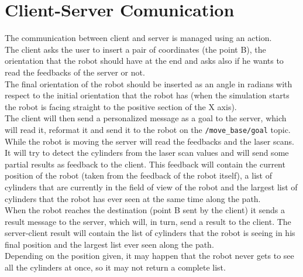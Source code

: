\section{Client-Server Comunication}
The communication between client and server is managed using an action.\\
The client asks the user to insert a pair of coordinates (the point B), the orientation that the robot should have at the end and asks also if he wants to read the feedbacks of the server or not.\\
The final orientation of the robot should be inserted as an angle in radians with respect to the initial orientation that the robot has (when the simulation starts the robot is facing straight to the positive section of the X axis).\\
The client will then send a personalized message as a goal to the server, which will read it, reformat it and send it to the robot on the \texttt{/move\_base/goal} topic.\\
While the robot is moving the server will read the feedbacks and the laser scans. It will try to detect the cylinders from the laser scan values and will send some partial results as feedback to the client. This feedback will contain the current position of the robot (taken from the feedback of the robot itself), a list of cylinders that are currently in the field of view of the robot and the largest list of cylinders that the robot has ever seen at the same time along the path.\\
When the robot reaches the destination (point B sent by the client) it sends a result message to the server, which will, in turn, send a result to the client. The server-client result will contain the list of cylinders that the robot is seeing in his final position and the largest list ever seen along the path.\\
Depending on the position given, it may happen that the robot never gets to see all the cylinders at once, so it may not return a complete list.